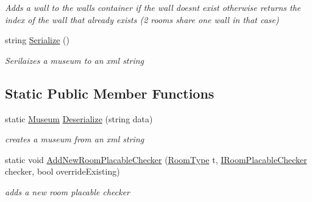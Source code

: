 \begin{DoxyCompactItemize}
\begin{DoxyCompactList}\small\item\em Adds a wall to the walls container if the wall doesn\textquotesingle{}t exist otherwise returns the index of the wall that already exists (2 rooms share one wall in that case) \end{DoxyCompactList}\item 
string \mbox{\hyperlink{class_museum_ac956bb7d7454f99944af157c79f695b8}{Serialize}} ()
\begin{DoxyCompactList}\small\item\em Serilaizes a museum to an xml string \end{DoxyCompactList}\end{DoxyCompactItemize}
\subsection*{Static Public Member Functions}
\begin{DoxyCompactItemize}
\item 
static \mbox{\hyperlink{class_museum}{Museum}} \mbox{\hyperlink{class_museum_a1b4fb627a19112e3ba3d25e8108de2c3}{Deserialize}} (string data)
\begin{DoxyCompactList}\small\item\em creates a museum from an xml string \end{DoxyCompactList}\item 
static void \mbox{\hyperlink{class_museum_a4317c41f1bef1ffeee3678f5c342c9aa}{Add\+New\+Room\+Placable\+Checker}} (\mbox{\hyperlink{_room_8cs_ab540f7414f306325d92272bcef1e34e1}{Room\+Type}} t, \mbox{\hyperlink{interface_i_room_placable_checker}{I\+Room\+Placable\+Checker}} checker, bool override\+Existing)
\begin{DoxyCompactList}\small\item\em adds a new room placable checker \end{DoxyCompactList}\end{DoxyCompactItemize}
